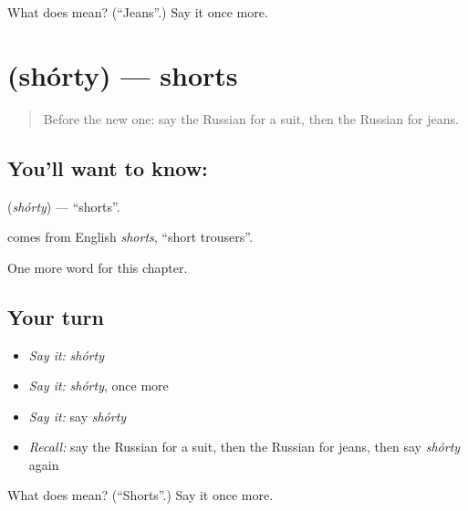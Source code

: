 \begin{tcolorbox}[breakable,colback=teal!4,colframe=teal!35!black,title={Before you move on}]
What does  mean? (\textquotedblleft{}Jeans\textquotedblright{}.) Say it once more.
\end{tcolorbox}
\section[\texorpdfstring{\ru{шорты} (shórty)}{шорты (shórty)}]{ (shórty) — shorts}

\label{lesson:RU-C248-shorty}



\begin{quote}
Before the new one: say the Russian for a suit, then the Russian for jeans.
\end{quote}

\subsection*{You'll want to know: }
\textbf{} (\emph{shórty}) — \textquotedblleft{}shorts\textquotedblright{}.

\begin{cousinweb}
\textbf{} comes from English \emph{shorts}, \textquotedblleft{}short trousers\textquotedblright{}.
\end{cousinweb}

\begin{grammarlens}[title={What you've built}]
One more word for this chapter.
\end{grammarlens}

\subsection*{Your turn}
\begin{itemize}
\raggedright
  \item \emph{Say it:} \emph{shórty}
  \item \emph{Say it:} \emph{shórty}, once more
  \item \emph{Say it:} say \emph{shórty}
  \item \emph{Recall:} say the Russian for a suit, then the Russian for jeans, then say \emph{shórty} again
\end{itemize}

\begin{tcolorbox}[breakable,colback=teal!4,colframe=teal!35!black,title={Before you move on}]
What does  mean? (\textquotedblleft{}Shorts\textquotedblright{}.) Say it once more.
\end{tcolorbox}

